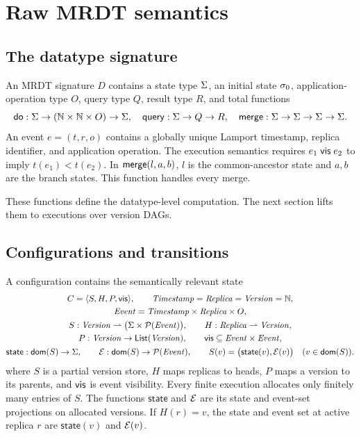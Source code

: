 \section{Raw MRDT semantics}

\subsection{The datatype signature}

\begin{definition}
An MRDT signature $D$ contains a state type $\state$, an initial state
$\init$, application-operation type $O$, query type $Q$, result type $R$, and
total functions
\[
 \mathsf{do}:\state\to(\mathbb N\times\mathbb N\times O)\to\state,
 \quad \mathsf{query}:\state\to Q\to R,
 \quad \merge:\state\to\state\to\state\to\state.
\]
An event $e=(t,r,o)$ contains a globally unique Lamport timestamp, replica
identifier, and application operation. The execution semantics requires
$e_1\vis e_2$ to imply $t(e_1)<t(e_2)$. In $\merge(l,a,b)$, $l$ is the
common-ancestor state and $a,b$ are the branch states. This function handles
every merge.
\hfill{}
\end{definition}

These functions define the datatype-level computation. The next section lifts
them to executions over version DAGs.

\subsection{Configurations and transitions}

A configuration contains the semantically relevant state
\[
\begin{gathered}
  C=\langle S,H,P,\vis\rangle,\qquad
  \mathit{Timestamp}=\mathit{Replica}=\mathit{Version}=\mathbb N,\\
  \mathit{Event}=\mathit{Timestamp}\times\mathit{Replica}\times O,\\
  S:\mathit{Version}\rightharpoonup
    \bigl(\state\times\mathcal P(\mathit{Event})\bigr),\qquad
  H:\mathit{Replica}\rightharpoonup\mathit{Version},\\
  P:\mathit{Version}\to\mathsf{List}(\mathit{Version}),\qquad
  \vis\;\subseteq\mathit{Event}\times\mathit{Event},\\
  \mathsf{state}:\mathsf{dom}(S)\to\state,\qquad
  \events:\mathsf{dom}(S)\to\mathcal P(\mathit{Event}),\qquad
  S(v)=\bigl(\mathsf{state}(v),\events(v)\bigr)
    \quad(v\in\mathsf{dom}(S)).
\end{gathered}
\]
where $S$ is a partial version store, $H$ maps replicas to heads, $P$ maps a
version to its parents, and $\vis$ is event visibility. Every finite execution
allocates only finitely many entries of $S$. The functions $\mathsf{state}$ and
$\events$ are its state and event-set projections on allocated versions. If
$H(r)=v$, the state and event set at active replica $r$ are
$\mathsf{state}(v)$ and $\events(v)$.

